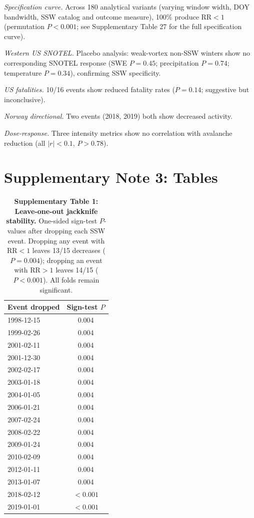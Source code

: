 \documentclass[11pt,letterpaper]{article}
\begin{document}
\textit{Specification curve.} Across 180 analytical variants (varying window width, DOY bandwidth, SSW catalog and outcome measure), 100\% produce $\mathrm{RR} < 1$ (permutation $P < 0.001$; see Supplementary Table 27 for the full specification curve).

\textit{Western US SNOTEL.} Placebo analysis: weak-vortex non-SSW winters show no corresponding SNOTEL response (SWE $P = 0.45$; precipitation $P = 0.74$; temperature $P = 0.34$), confirming SSW specificity.

\textit{US fatalities.} 10/16 events show reduced fatality rates ($P = 0.14$; suggestive but inconclusive).

\textit{Norway directional.} Two events (2018, 2019) both show decreased activity.

\textit{Dose-response.} Three intensity metrics show no correlation with avalanche reduction (all $|r| < 0.1$, $P > 0.78$).

\section{Supplementary Note 3: Tables}

\begin{table}[!ht]
\centering
\caption{\textbf{Supplementary Table 1: Leave-one-out jackknife stability.}
One-sided sign-test $P$-values after dropping each SSW event. Dropping any event with $\mathrm{RR} < 1$ leaves 13/15 decreases ($P = 0.004$); dropping an event with $\mathrm{RR} > 1$ leaves 14/15 ($P < 0.001$). All folds remain significant.}
\label{stab:loo}
\small
\begin{tabular}{lc}
\toprule
Event dropped & Sign-test $P$ \\
\midrule
1998-12-15 & 0.004 \\
1999-02-26 & 0.004 \\
2001-02-11 & 0.004 \\
2001-12-30 & 0.004 \\
2002-02-17 & 0.004 \\
2003-01-18 & 0.004 \\
2004-01-05 & 0.004 \\
2006-01-21 & 0.004 \\
2007-02-24 & 0.004 \\
2008-02-22 & 0.004 \\
2009-01-24 & 0.004 \\
2010-02-09 & 0.004 \\
2012-01-11 & 0.004 \\
2013-01-07 & 0.004 \\
2018-02-12 & $< 0.001$ \\
2019-01-01 & $< 0.001$ \\
\bottomrule
\end{tabular}
\end{table}
\end{document}
